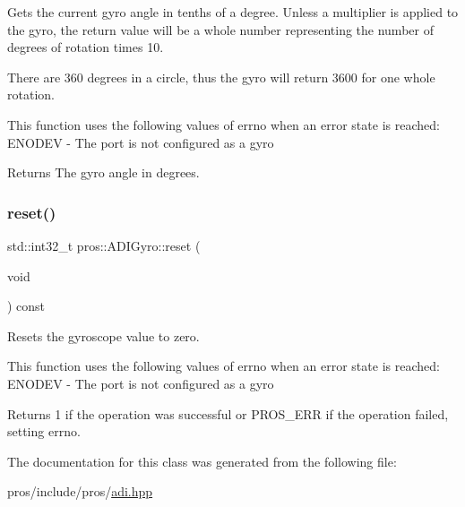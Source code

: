 Gets the current gyro angle in tenths of a degree. Unless a multiplier is applied to the gyro, the return value will be a whole number representing the number of degrees of rotation times 10.

There are 360 degrees in a circle, thus the gyro will return 3600 for one whole rotation.

This function uses the following values of errno when an error state is reached\+: E\+N\+O\+D\+EV -\/ The port is not configured as a gyro

\begin{DoxyReturn}{Returns}
The gyro angle in degrees. 
\end{DoxyReturn}
\mbox{\label{classpros_1_1ADIGyro_a3e2df8c21f4eb0bfa3559834221195fe}} 
\subsubsection{\texorpdfstring{reset()}{reset()}}
{\footnotesize\ttfamily std\+::int32\+\_\+t pros\+::\+A\+D\+I\+Gyro\+::reset (\begin{DoxyParamCaption}\item[{void}]{ }\end{DoxyParamCaption}) const}

Resets the gyroscope value to zero.

This function uses the following values of errno when an error state is reached\+: E\+N\+O\+D\+EV -\/ The port is not configured as a gyro

\begin{DoxyReturn}{Returns}
1 if the operation was successful or P\+R\+O\+S\+\_\+\+E\+RR if the operation failed, setting errno. 
\end{DoxyReturn}


The documentation for this class was generated from the following file\+:\begin{DoxyCompactItemize}
\item 
pros/include/pros/\hyperlink{adi_8hpp}{adi.\+hpp}\end{DoxyCompactItemize}

